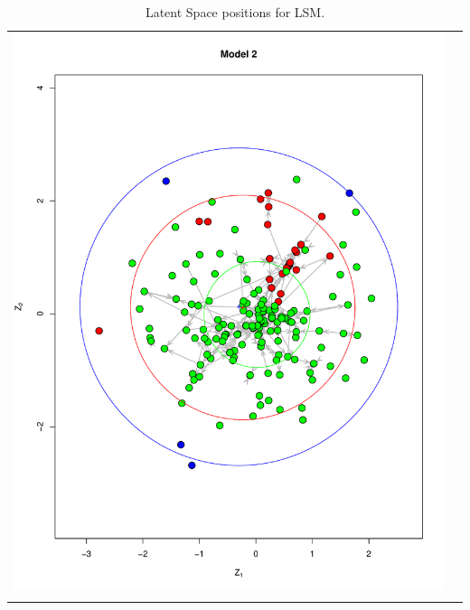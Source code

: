 \documentclass[fleqn,12pt]{wlscirep}
\begin{document}
\begin{longtable}[!h]{c@{\hskip 0cm}c}
\includegraphics[height=.75\textheight, clip=true, trim=.5cm .5cm 0cm .6cm]{figures/LSM_m2.pdf}   \\
\caption{\label{fig:LSM_plot_2} Latent Space positions for LSM.}
\end{longtable}
\end{document}
